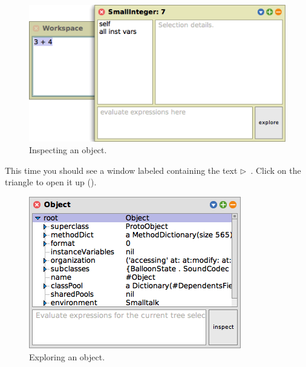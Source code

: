 \documentclass[a4paper,10pt,twoside]{book}
\begin{document}
\begin{figure}[htb]
\centerline {\includegraphics[scale=0.65]{InspectIt}}
\caption{Inspecting an object. \label{fig:inspectit}}
\end{figure}



This time you should see a window labeled  containing the text
\mbox{$\triangleright$ }.
Click on the triangle to open it up ().

\begin{figure}[htb]
\centerline {\includegraphics[scale=0.65]{ExploreIt}}
\caption{Exploring an object. \label{fig:exploreit}}
\end{figure}
\end{document}
